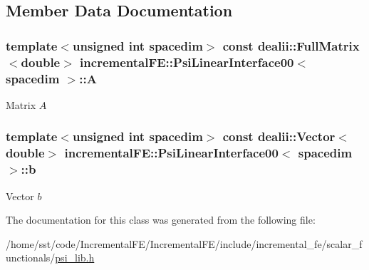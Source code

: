 \subsection{Member Data Documentation}
\subsubsection[{\texorpdfstring{A}{A}}]{\setlength{\rightskip}{0pt plus 5cm}template$<$unsigned int spacedim$>$ const dealii\+::\+Full\+Matrix$<$double$>$ {\bf incremental\+F\+E\+::\+Psi\+Linear\+Interface00}$<$ spacedim $>$\+::A\hspace{0.3cm}{\ttfamily [private]}}\hypertarget{classincremental_f_e_1_1_psi_linear_interface00_a58c4e916fb9d722b16963e213235ed81}{}\label{classincremental_f_e_1_1_psi_linear_interface00_a58c4e916fb9d722b16963e213235ed81}
Matrix $A$ 
\subsubsection[{\texorpdfstring{b}{b}}]{\setlength{\rightskip}{0pt plus 5cm}template$<$unsigned int spacedim$>$ const {\bf dealii\+::\+Vector}$<$double$>$ {\bf incremental\+F\+E\+::\+Psi\+Linear\+Interface00}$<$ spacedim $>$\+::b\hspace{0.3cm}{\ttfamily [private]}}\hypertarget{classincremental_f_e_1_1_psi_linear_interface00_a67da23f105ba3e30884099c71c972b56}{}\label{classincremental_f_e_1_1_psi_linear_interface00_a67da23f105ba3e30884099c71c972b56}
Vector $b$ 

The documentation for this class was generated from the following file\+:\begin{DoxyCompactItemize}
\item 
/home/sst/code/\+Incremental\+F\+E/\+Incremental\+F\+E/include/incremental\+\_\+fe/scalar\+\_\+functionals/\hyperlink{psi__lib_8h}{psi\+\_\+lib.\+h}\end{DoxyCompactItemize}
